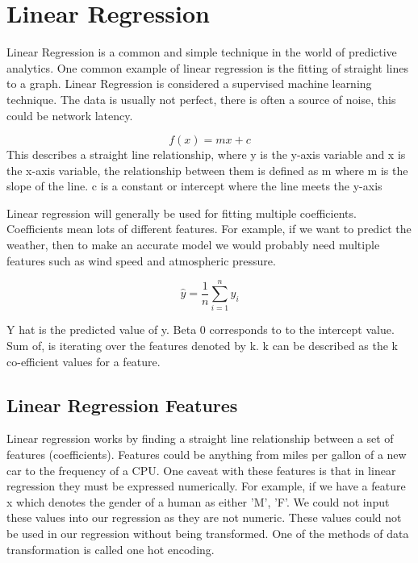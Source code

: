\section{Linear Regression}

Linear Regression is a common and simple technique in the world of predictive analytics. One common example of linear regression is the fitting of straight lines to a graph. Linear Regression is considered a supervised machine learning technique. The data is usually not perfect, there is often a source of noise, this could be network latency.

\begin{equation}
    f(x) = mx+c
\end{equation}
This describes a straight line relationship, where y is the y-axis variable and x is the x-axis variable, the relationship between them is defined as m where m is the slope of the line. c is a constant or intercept where the line meets the y-axis

Linear regression will generally be used for fitting multiple coefficients. Coefficients mean lots of different features. For example, if we want to predict the weather, then to make an accurate model we would probably need multiple features such as wind speed and atmospheric pressure.

\begin{equation}
\hat{y} = \frac{1}{n}\sum_{i=1}^n y_i
\end{equation}

Y hat is the predicted value of y. Beta 0 corresponds to to the intercept value. Sum of, is iterating over the features denoted by k. k can be described as the k co-efficient values for a feature.

\subsection{Linear Regression Features}

Linear regression works by finding a straight line relationship between a set of features (coefficients). Features could be anything from miles per gallon of a new car to the frequency of a CPU. One caveat with these features is that in linear regression they must be expressed numerically. For example, if we have a feature x which denotes the gender of a human as either 'M', 'F'. We could not input these values into our regression as they are not numeric. These values could not be used in our regression without being transformed. One of the methods of data transformation is called one hot encoding. 

